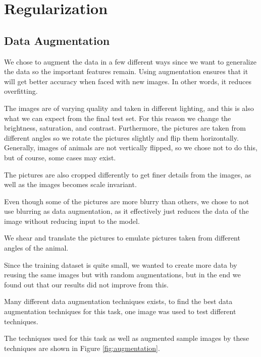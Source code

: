 \section{Regularization}

\subsection{Data Augmentation}
We chose to augment the data in a few different ways since we want to generalize the data so the important features remain. 
Using augmentation ensures that it will get better accuracy when faced with new images. In other words, it reduces overfitting.

The images are of varying quality and taken in different lighting, and this is also what we can expect from the final test set.
For this reason we change the brightness, saturation, and contrast. Furthermore, the pictures are taken from different angles so we rotate the pictures slightly and flip them horizontally. Generally, images of animals are not vertically flipped, so we chose not to do this, but of course, some cases may exist.

The pictures are also cropped differently to get finer details from the images, as well as the images becomes scale invariant.

Even though some of the pictures are more blurry than others, we chose to not use blurring as data augmentation, as it effectively just reduces the data of the image without reducing input to the model.

We shear and translate the pictures to emulate pictures taken from different angles of the animal.

Since the training dataset is quite small, we wanted to create more data by reusing the same images but with random augmentations, but in the end we found out that our results did not improve from this.


Many different data augmentation techniques exists, to find the best data augmentation techniques for this task, one image was used to test different techniques.



The techniques used for this task as well as augmented sample images by these techniques are shown in Figure \ref{fig:augmentation}.

